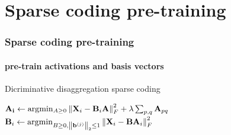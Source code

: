 \documentclass[gray]{beamer}
\begin{document}
\section{Sparse coding pre-training}
\begin{frame}
\frametitle{Sparse coding pre-training}
\framesubtitle{pre-train activations and basis vectors}
\begin{algorithm}[H]
\caption{Dicriminative disaggregation sparse coding}
\label{alg:DDSC}
\begin{algorithmic}[1]
\Statex \hspace{0.4in} $\mathbf{A_i} \leftarrow \arg \! \min_{A \geq 0} \left\lVert\mathbf{X}_i - \mathbf{B}_i\mathbf{A}\right\rVert_F^2 + \lambda \sum_{p,q} \mathbf{A}_{pq}$
\Statex \hspace{0.4in} $\mathbf{B}_i \leftarrow  \arg \! \min_{B \geq 0,\left\lVert\mathbf{b}^{(j)}\right\rVert_2 \leq 1} \left\lVert\mathbf{X}_i - \mathbf{B} \mathbf{A}_i \right\rVert_F^2$
\end{algorithmic}
\end{algorithm}
\end{frame}


\end{document}
